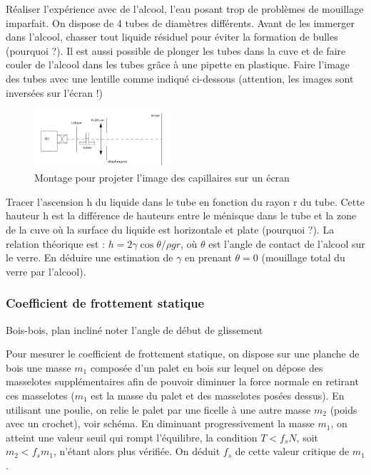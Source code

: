 \documentclass{article}%
\begin{document}
Réaliser l'expérience avec de l'alcool, l'eau posant trop de problèmes de mouillage imparfait. On dispose de 4 tubes de diamètres différents. Avant de les immerger dans l'alcool, chasser tout liquide résiduel pour éviter la formation de bulles (pourquoi ?). Il est aussi possible de plonger les tubes dans la cuve et de faire couler de l'alcool dans les tubes grâce à une pipette en plastique. 
Faire l'image des tubes avec une lentille comme indiqué ci-dessous (attention, les images sont inversées sur l'écran !)


\begin{figure}
      \centerline{\includegraphics[width=5cm]{images-exp/Jurin2.png}}
 \caption{Montage pour projeter l'image des capillaires sur un écran}
\end{figure}

Tracer l'ascension h du liquide dans le tube en fonction du rayon r du tube. Cette hauteur h est la différence de hauteurs entre le ménisque dans le tube et la zone de la cuve où la surface du liquide est horizontale et plate (pourquoi ?). La relation théorique est : $h = 2 \gamma \cos \theta/ \rho g r$, où $\theta$ est l'angle de contact de l'alcool sur le verre. En déduire une estimation de $\gamma$ en prenant $\theta = 0$ (mouillage total du verre par l'alcool).

\subsubsection{Coefficient de frottement statique}
Bois-bois, plan incliné noter l'angle de début de glissement

Pour mesurer le coefficient de frottement statique, on dispose sur une planche de bois une masse $m_1$ composée d'un palet en bois sur lequel on dépose des masselotes supplémentaires afin de pouvoir diminuer la force normale en retirant ces masselotes ($m_1$ est la masse du palet et des masselotes posées dessus). En utilisant une poulie, on relie le palet par une ficelle à une autre masse $m_2$ (poids avec un crochet), voir schéma. En diminuant progressivement la masse $m_1$, on atteint une valeur seuil qui rompt l'équilibre, la condition $T<f_sN$, soit $m_2<f_sm_1$, n'étant alors plus vérifiée. On déduit $f_s$ de cette valeur critique de $m_1$. 
\end{document}
